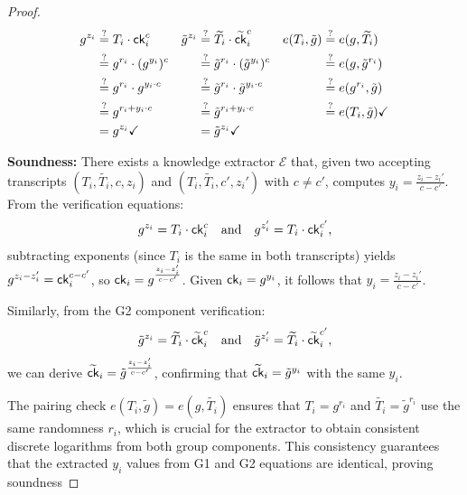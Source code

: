 \begin{proof}

            \begin{align*}
        g^{z_i} &\stackrel{?}{=} T_i \cdot \mathsf{ck}_i^c      & \tilde{g}^{z_i} &\stackrel{?}{=} \widetilde{T_i} \cdot \widetilde{\mathsf{ck}}_i^c & e(T_i, \tilde{g}) &\stackrel{?}{=} e(g, \widetilde{T_i})     \\
        &\stackrel{?}{=} g^{r_i} \cdot (g^{y_i})^c      &  &\stackrel{?}{=} \tilde{g}^{r_i} \cdot (\tilde{g}^{y_i})^c                  & &\stackrel{?}{=} e(g, \tilde{g}^{r_i}) \\
        &\stackrel{?}{=} g^{r_i} \cdot g^{y_i \cdot c}  &   &\stackrel{?}{=} \tilde{g}^{r_i} \cdot \tilde{g}^{y_i \cdot c}             &  &\stackrel{?}{=} e(g^{r_i}, \tilde{g})  \\
        &\stackrel{?}{=} g^{r_i + y_i \cdot c}          &   &\stackrel{?}{=} \tilde{g}^{r_i + y_i \cdot c}                             & &\stackrel{?}{=} e(T_i, \tilde{g}) \checkmark \\
        &= g^{z_i} \checkmark                           &  &= \tilde{g}^{z_i} \checkmark
        \end{align*}

    \item \textbf{Soundness:} There exists a knowledge extractor $\mathcal{E}$ that, given two accepting transcripts $(T_i, \widetilde{T_i}, c, z_i)$ and $(T_i, \widetilde{T_i}, c', z_i')$ with $c \neq c'$, computes $y_i = \frac{z_i - z_i'}{c - c'}$. From the verification equations:
    \[
    g^{z_i} = T_i \cdot \mathsf{ck}_i^c \quad \text{and} \quad g^{z_i'} = T_i \cdot \mathsf{ck}_i^{c'},
    \]
    subtracting exponents (since $T_i$ is the same in both transcripts) yields $g^{z_i - z_i'} = \mathsf{ck}_i^{c - c'}$, so $\mathsf{ck}_i = g^{\frac{z_i - z_i'}{c - c'}}$. Given $\mathsf{ck}_i = g^{y_i}$, it follows that $y_i = \frac{z_i - z_i'}{c - c'}$.
    
    Similarly, from the G2 component verification:
    \[
    \tilde{g}^{z_i} = \widetilde{T_i} \cdot \widetilde{\mathsf{ck}}_i^c \quad \text{and} \quad \tilde{g}^{z_i'} = \widetilde{T_i} \cdot \widetilde{\mathsf{ck}}_i^{c'},
    \]
    we can derive $\widetilde{\mathsf{ck}}_i = \tilde{g}^{\frac{z_i - z_i'}{c - c'}}$, confirming that $\widetilde{\mathsf{ck}}_i = \tilde{g}^{y_i}$ with the same $y_i$.
    
    The pairing check $e(T_i, \tilde{g}) = e(g, \widetilde{T_i})$ ensures that $T_i = g^{r_i}$ and $\widetilde{T_i} = \tilde{g}^{r_i}$ use the same randomness $r_i$, which is crucial for the extractor to obtain consistent discrete logarithms from both group components. This consistency guarantees that the extracted $y_i$ values from G1 and G2 equations are identical, proving soundness



\end{proof}
